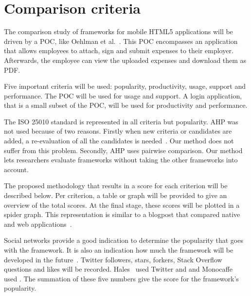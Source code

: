 \documentclass[a4paper]{artikel3}
\newcommand{\setspace}[0]{\vspace{2mm}}
\renewcommand{\paragraph}[1]{\setspace \noindent {\bf #1}  }
\begin{document}

\section{Comparison criteria} %
\label{sec:comparisoncriteria}

The comparison study of frameworks for mobile HTML5 applications will be driven by a POC, like Oehlman et al.~\cite{Oeflman2011}.
This POC encompasses an application that allows employees to attach, sign and submit expenses to their employer.
Afterwards, the employee can view the uploaded expenses and download them as PDF.

Five important criteria will be used:  popularity,  productivity,  usage,  support and performance. 
The POC will be used for usage and support.   
A login application, that is a small subset of the POC, will be used for productivity and performance.
 
The ISO 25010 standard is represented in all criteria but popularity.
AHP was not used because of two reasons.
Firstly when new criteria or candidates are added, a re-evaluation of all the candidates is needed~\cite{Jadhav2009}. 
Our method does not suffer from this problem.
Secondly, AHP uses pairwise comparison.
Our method lets researchers evaluate frameworks without taking the other frameworks into account. 

The proposed methodology that results in a score for each criterion will be described below.  
Per criterion,  a table or graph will be provided to give an overview of the total scores.
At the final stage, these scores will be plotted in a spider graph.
This representation is similar to a blogpost that compared native and web applications~\cite{Jeroen2012}.   

\paragraph{Popularity}
Social networks provide a good indication to determine the popularity that goes with the framework.  
It is also an indication how much the framework will be developed in the future~\cite{Sarrafi2012a}.
Twitter followers,  \gh{} stars,  \gh{} forkers,  Stack Overflow questions and \fb{} likes will be recorded.
Hales~\cite{Hales2012} used Twitter and \gh{} and Monocaffe~\cite{Ayuso2012} used \so{}.
The summation of these five numbers give the score for the framework's popularity.  
\end{document}
